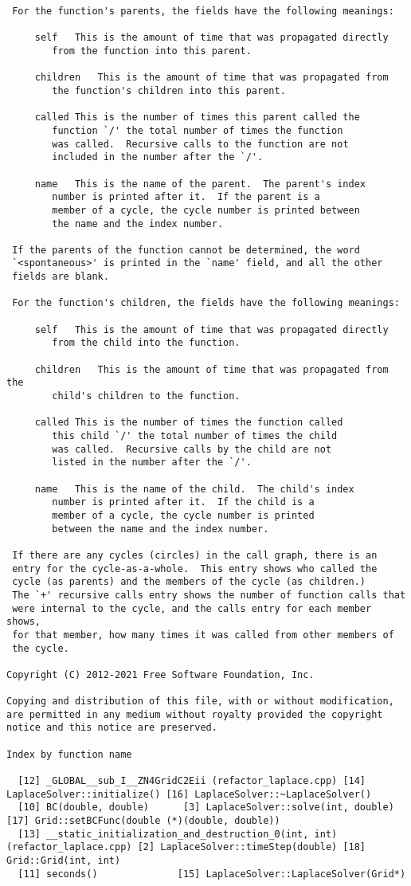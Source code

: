 \documentclass[a4paper,twosidep]{article}
\begin{document}
\begin{verbatim}
 For the function's parents, the fields have the following meanings:

     self	This is the amount of time that was propagated directly
		from the function into this parent.

     children	This is the amount of time that was propagated from
		the function's children into this parent.

     called	This is the number of times this parent called the
		function `/' the total number of times the function
		was called.  Recursive calls to the function are not
		included in the number after the `/'.

     name	This is the name of the parent.  The parent's index
		number is printed after it.  If the parent is a
		member of a cycle, the cycle number is printed between
		the name and the index number.

 If the parents of the function cannot be determined, the word
 `<spontaneous>' is printed in the `name' field, and all the other
 fields are blank.

 For the function's children, the fields have the following meanings:

     self	This is the amount of time that was propagated directly
		from the child into the function.

     children	This is the amount of time that was propagated from the
		child's children to the function.

     called	This is the number of times the function called
		this child `/' the total number of times the child
		was called.  Recursive calls by the child are not
		listed in the number after the `/'.

     name	This is the name of the child.  The child's index
		number is printed after it.  If the child is a
		member of a cycle, the cycle number is printed
		between the name and the index number.

 If there are any cycles (circles) in the call graph, there is an
 entry for the cycle-as-a-whole.  This entry shows who called the
 cycle (as parents) and the members of the cycle (as children.)
 The `+' recursive calls entry shows the number of function calls that
 were internal to the cycle, and the calls entry for each member shows,
 for that member, how many times it was called from other members of
 the cycle.

Copyright (C) 2012-2021 Free Software Foundation, Inc.

Copying and distribution of this file, with or without modification,
are permitted in any medium without royalty provided the copyright
notice and this notice are preserved.

Index by function name

  [12] _GLOBAL__sub_I__ZN4GridC2Eii (refactor_laplace.cpp) [14] LaplaceSolver::initialize() [16] LaplaceSolver::~LaplaceSolver()
  [10] BC(double, double)      [3] LaplaceSolver::solve(int, double) [17] Grid::setBCFunc(double (*)(double, double))
  [13] __static_initialization_and_destruction_0(int, int) (refactor_laplace.cpp) [2] LaplaceSolver::timeStep(double) [18] Grid::Grid(int, int)
  [11] seconds()              [15] LaplaceSolver::LaplaceSolver(Grid*)
\end{verbatim}
\end{document}
